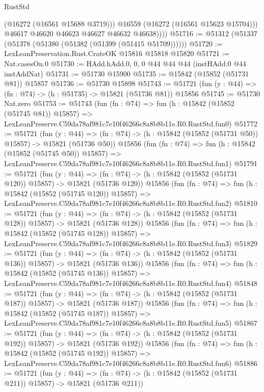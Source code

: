 \begin{lexlean}{RustStd}
\begin{coremodule}
                (@16272 (@16561 @15688 @3719)))
              @16559
              (@16272 (@16561 @15623 @15704)))
            @46617
            @46620
            @46623
            @46627
            @46632
            @46638))))
@51716 := @51312 (@51337 (@51378 (@51380 (@51382 (@51399 (@51415 @51709))))))
@51720 := LexLeanPreservation.Rust.CrateOK @15816 @15818 @15820
@51721 := Nat.casesOn.{0}
@51730 := HAdd.hAdd.{0, 0, 0} @44 @44 @44 (instHAdd.{0} @44 instAddNat)
@51731 := @51730 @15900
@51735 := @15842 (@15852 (@51731 @81)) @15857
@51736 := @51730 @15898
@51743 := @51721 (fun (y : @44) => (fn : @74) -> (h : @51735) -> @15821 (@51736 @81)) @15856
@51745 := @51730 Nat.zero
@51753 := @51743
    (fun (fn : @74) =>
    fun (h : @15842 (@15852 (@51745 @81)) @15857) =>
    LexLeanPreserve.C59da78af981c7e10f46266c8a8b8b11e.R0.RustStd.fun0)
@51772 := @51721
    (fun (y : @44) =>
    (fn : @74) -> (h : @15842 (@15852 (@51731 @50)) @15857) -> @15821 (@51736 @50))
    @15856
    (fun (fn : @74) =>
    fun (h : @15842 (@15852 (@51745 @50)) @15857) =>
    LexLeanPreserve.C59da78af981c7e10f46266c8a8b8b11e.R0.RustStd.fun1)
@51791 := @51721
    (fun (y : @44) =>
    (fn : @74) -> (h : @15842 (@15852 (@51731 @120)) @15857) -> @15821 (@51736 @120))
    @15856
    (fun (fn : @74) =>
    fun (h : @15842 (@15852 (@51745 @120)) @15857) =>
    LexLeanPreserve.C59da78af981c7e10f46266c8a8b8b11e.R0.RustStd.fun2)
@51810 := @51721
    (fun (y : @44) =>
    (fn : @74) -> (h : @15842 (@15852 (@51731 @128)) @15857) -> @15821 (@51736 @128))
    @15856
    (fun (fn : @74) =>
    fun (h : @15842 (@15852 (@51745 @128)) @15857) =>
    LexLeanPreserve.C59da78af981c7e10f46266c8a8b8b11e.R0.RustStd.fun3)
@51829 := @51721
    (fun (y : @44) =>
    (fn : @74) -> (h : @15842 (@15852 (@51731 @136)) @15857) -> @15821 (@51736 @136))
    @15856
    (fun (fn : @74) =>
    fun (h : @15842 (@15852 (@51745 @136)) @15857) =>
    LexLeanPreserve.C59da78af981c7e10f46266c8a8b8b11e.R0.RustStd.fun4)
@51848 := @51721
    (fun (y : @44) =>
    (fn : @74) -> (h : @15842 (@15852 (@51731 @187)) @15857) -> @15821 (@51736 @187))
    @15856
    (fun (fn : @74) =>
    fun (h : @15842 (@15852 (@51745 @187)) @15857) =>
    LexLeanPreserve.C59da78af981c7e10f46266c8a8b8b11e.R0.RustStd.fun5)
@51867 := @51721
    (fun (y : @44) =>
    (fn : @74) -> (h : @15842 (@15852 (@51731 @192)) @15857) -> @15821 (@51736 @192))
    @15856
    (fun (fn : @74) =>
    fun (h : @15842 (@15852 (@51745 @192)) @15857) =>
    LexLeanPreserve.C59da78af981c7e10f46266c8a8b8b11e.R0.RustStd.fun6)
@51886 := @51721
    (fun (y : @44) =>
    (fn : @74) -> (h : @15842 (@15852 (@51731 @211)) @15857) -> @15821 (@51736 @211))

\end{coremodule}
\end{lexlean}
